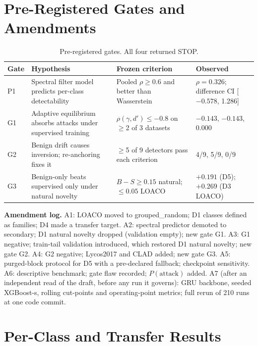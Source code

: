\documentclass[conference]{IEEEtran}
\begin{document}
\section{Pre-Registered Gates and Amendments}
\label{app:neg}
\begin{table}[!t]
\centering\scriptsize\setlength{\tabcolsep}{2pt}
\caption{Pre-registered gates. All four returned STOP.}
\label{tab:gates}
\begin{tabular}{p{}p{}p{}p{}}
\toprule
Gate & Hypothesis & Frozen criterion & Observed\\
\midrule
P1 & Spectral filter model predicts per-class detectability & Pooled $\rho\ge0.6$ and better than Wasserstein & $\rho{=}0.326$; difference CI [$-0.578$, 1.286]\\
G1 & Adaptive equilibrium absorbs attacks under supervised training & $\rho(\gamma,d')\le-0.8$ on $\ge$2 of 3 datasets & $-0.143$, $-0.143$, 0.000\\
G2 & Benign drift causes inversion; re-anchoring fixes it & $\ge$5 of 9 detectors pass each criterion & 4/9, 5/9, 0/9\\
G3 & Benign-only beats supervised only under natural novelty & $B{-}S\ge0.15$ natural; $\le0.05$ LOACO & $+0.191$ (D5); $+0.269$ (D3 LOACO)\\
\bottomrule
\end{tabular}
\end{table}

\textbf{Amendment log.} A1: LOACO moved to grouped\_random; D1 classes defined as families; D4 made a transfer target. A2: spectral predictor demoted to secondary; D1 natural novelty dropped (validation empty); new gate G1. A3: G1 negative; train-tail validation introduced, which restored D1 natural novelty; new gate G2. A4: G2 negative; Lycos2017 and CLAD added; new gate G3. A5: purged-block protocol for D5 with a pre-declared fallback; checkpoint sensitivity. A6: descriptive benchmark; gate flaw recorded; $P(\text{attack})$ added. A7 (after an independent read of the draft, before any run it governs): GRU backbone, seeded XGBoost-s, rolling cut-points and operating-point metrics; full rerun of 210 runs at one code commit.

\section{Per-Class and Transfer Results}

\fi
\end{document}
